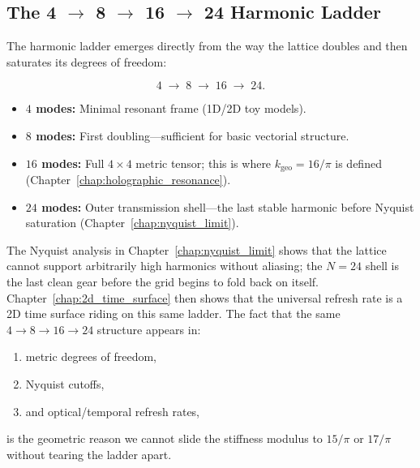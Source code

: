 \documentclass[11pt, letterpaper, openany]{book}
\begin{document}
\subsection{The 4 \texorpdfstring{$\rightarrow$}{→} 8 \texorpdfstring{$\rightarrow$}{→} 16 \texorpdfstring{$\rightarrow$}{→} 24 Harmonic Ladder}
\label{subsec:harmonic_ladder}

The harmonic ladder emerges directly from the way the lattice doubles and then saturates
its degrees of freedom:

\begin{equation}
    4 \;\rightarrow\; 8 \;\rightarrow\; 16 \;\rightarrow\; 24.
\end{equation}

\begin{itemize}
    \item \textbf{$4$ modes:} Minimal resonant frame (1D/2D toy models).
    \item \textbf{$8$ modes:} First doubling---sufficient for basic vectorial structure.
    \item \textbf{$16$ modes:} Full $4 \times 4$ metric tensor; this is where $k_{\text{geo}} = 16/\pi$
          is defined (Chapter~\ref{chap:holographic_resonance}).
    \item \textbf{$24$ modes:} Outer transmission shell---the last stable harmonic before
          Nyquist saturation (Chapter~\ref{chap:nyquist_limit}).
\end{itemize}

The Nyquist analysis in Chapter~\ref{chap:nyquist_limit} shows that the lattice cannot
support arbitrarily high harmonics without aliasing; the $N=24$ shell is the last clean
gear before the grid begins to fold back on itself. Chapter~\ref{chap:2d_time_surface}
then shows that the universal refresh rate is a 2D time surface riding on this same ladder.
The fact that the same $4 \rightarrow 8 \rightarrow 16 \rightarrow 24$ structure appears in:

\begin{enumerate}
    \item metric degrees of freedom,
    \item Nyquist cutoffs,
    \item and optical/temporal refresh rates,
\end{enumerate}

is the geometric reason we cannot slide the stiffness modulus to $15/\pi$ or $17/\pi$
without tearing the ladder apart.
\end{document}
